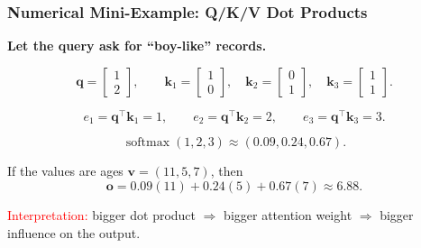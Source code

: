 \documentclass[notes,11pt, aspectratio=169]{beamer}
\DeclareMathOperator{\softmax}{softmax}
\newcommand{\vk}{\mathbf{k}}
\newcommand{\vo}{\mathbf{o}}
\newcommand{\vq}{\mathbf{q}}
\newcommand{\vv}{\mathbf{v}}
\begin{document}
\begin{frame}
\frametitle{Numerical Mini-Example: Q/K/V Dot Products}

\textbf{Let the query ask for ``boy-like'' records.}

\vspace{4pt}
\[
    \vq =
    \begin{bmatrix} 1 \\ 2 \end{bmatrix},
    \qquad
    \vk_1 =
    \begin{bmatrix} 1 \\ 0 \end{bmatrix},
    \quad
    \vk_2 =
    \begin{bmatrix} 0 \\ 1 \end{bmatrix},
    \quad
    \vk_3 =
    \begin{bmatrix} 1 \\ 1 \end{bmatrix}.
\]

\vspace{2pt}
\[
    e_1 = \vq^\top \vk_1 = 1,
    \qquad
    e_2 = \vq^\top \vk_2 = 2,
    \qquad
    e_3 = \vq^\top \vk_3 = 3.
\]

\vspace{4pt}
\[
    \softmax(1,2,3) \approx (0.09, 0.24, 0.67).
\]

\vspace{4pt}
If the values are ages $\vv = (11, 5, 7)$, then
\[
    \vo = 0.09(11) + 0.24(5) + 0.67(7) \approx 6.88.
\]

\textcolor{red}{Interpretation:} bigger dot product $\Rightarrow$ bigger attention weight $\Rightarrow$ bigger influence on the output.
\end{frame}
\end{document}
